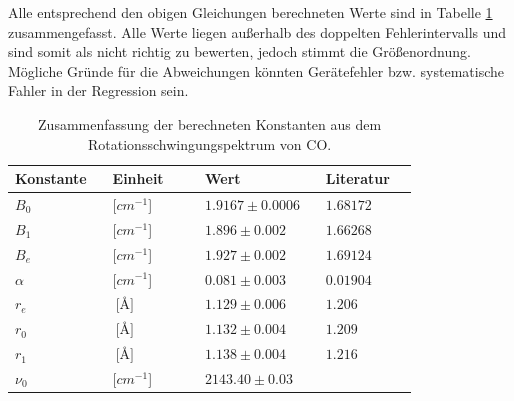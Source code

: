 Alle entsprechend den obigen Gleichungen berechneten Werte sind in Tabelle \ref{Zusammenfassung} zusammengefasst. Alle Werte liegen außerhalb des doppelten Fehlerintervalls und sind somit als nicht richtig zu bewerten, jedoch stimmt die Größenordnung. Mögliche Gründe für die Abweichungen könnten Gerätefehler bzw. systematische Fahler in der Regression sein.

\begin{table}
\label{Zusammenfassung}
	\caption{Zusammenfassung der berechneten Konstanten aus dem Rotationsschwingungspektrum von CO.  }
\begin{tabular}{C{0.2\linewidth}|C{0.2\linewidth}|C{0.2\linewidth}|C{0.2\linewidth}}
Konstante             & Einheit                  & Wert                           & Literatur \\ \hline
$B_0$                  & [$cm^{-1}$]          & $1.9167 \pm 0.0006$	& $1.68172$   \\
$B_1$                  & [$cm^{-1}$]          & $1.896 \pm 0.002$   	& $1.66268$   \\
$B_e $                 & [$cm^{-1}$]          & $1.927 \pm 0.002$   	& $1.69124$   \\
$\alpha$		& [$cm^{-1}$]       & $0.081 \pm 0.003$   	& $0.01904$   \\
$r_e$                  & $\SI{}{[\angstrom]}$		& $1.129 \pm 0.006 $  	& $1.206$     \\
$r_0$                  & $\SI{}{[\angstrom]} $		& $1.132 \pm 0.004$  	 & $1.209$     \\
$r_1$                  & $\SI{}{[\angstrom]}$ 		& $1.138 \pm 0.004$  	 & $1.216$    \\
$\nu_0$	&[$cm^{-1}$]          & $2143.40 \pm 0.03$&
\end{tabular}
\end{table}

%

